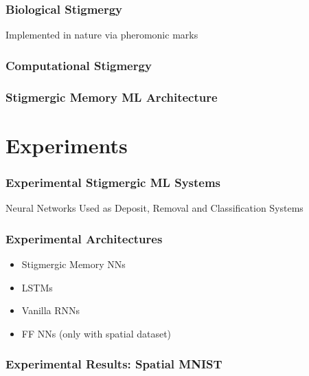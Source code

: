\documentclass{beamer}
\begin{document}
\begin{frame}
    \frametitle{Biological Stigmergy}
    \begin{center}
        Implemented in nature via pheromonic marks 
    \end{center}
    \pause
    
\end{frame}

\begin{frame}
    \frametitle{Computational Stigmergy}
    
\end{frame}

\begin{frame}
    \frametitle{Stigmergic Memory ML Architecture}
    
\end{frame}


\section{Experiments}
\begin{frame}
    \frametitle{Experimental Stigmergic ML Systems}
    Neural Networks Used as Deposit, Removal and Classification Systems
    \vspace{1.5cm}
    
\end{frame}

\begin{frame}
    \frametitle{Experimental Architectures}
    \begin{itemize}
        \item Stigmergic Memory NNs
        \item LSTMs
        \item Vanilla RNNs
        \item FF NNs (only with spatial dataset)
    \end{itemize}
\end{frame}

\begin{frame}
    \frametitle{Experimental Results: Spatial MNIST}
    
\end{frame}
\end{document}
